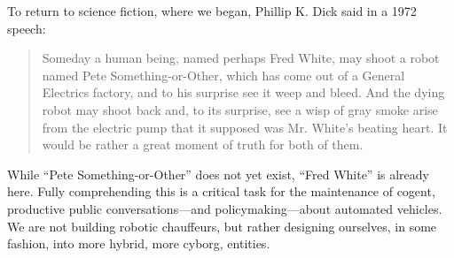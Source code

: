 To return to science fiction, where we began, Phillip K. Dick said in
a 1972 speech: 
\begin{quote}
Someday a human being, named perhaps Fred White, may shoot a robot
named Pete Something-or-Other, which has come out of a General
Electrics factory, and to his surprise see it weep and bleed. And the
dying robot may shoot back and, to its surprise, see a wisp of gray
smoke arise from the electric pump that it supposed was Mr. White's
beating heart. It would be rather a great moment of truth for both of
them.\cite{???-http://boingboing.net/2015/03/10/philip-k-dicks-androids-blu.html}
\end{quote}
While ``Pete Something-or-Other'' does not yet exist, ``Fred White''
is already here. Fully comprehending this is a critical task for the
maintenance of cogent, productive public conversations---and
policymaking---about automated vehicles. We are not building robotic
chauffeurs, but rather designing ourselves, in some fashion, into more
hybrid, more cyborg, entities.



